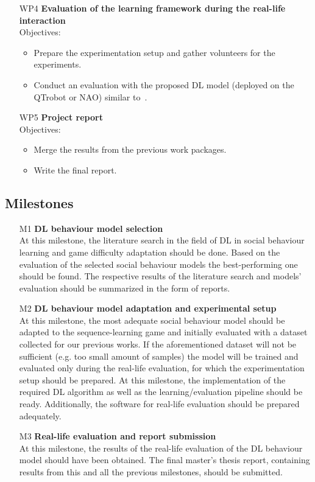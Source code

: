 \documentclass[thesis]{mas_proposal}
\begin{document}
\begin{enumerate}
\begin{itemize}
	\end{itemize}
	\item [WP4] \textbf{Evaluation of the learning framework during the real-life interaction} \\
	Objectives:
	\begin{itemize}
		\item Prepare the experimentation setup and gather volunteers for the experiments. 
		\item Conduct an evaluation with the proposed DL model (deployed on the QTrobot or NAO) similar to~\cite{Qureshi2016,romeo2021human}.
	\end{itemize}
	\item [WP5] \textbf{Project report} \\
	Objectives:
	\begin{itemize}
		\item Merge the results from the previous work packages.
		\item Write the final report.
	\end{itemize}
\end{enumerate}

\subsection{Milestones}
\begin{enumerate}
	\item[M1] \textbf{DL behaviour model selection} \\
	At this milestone, the literature search in the field of DL in social behaviour learning and game difficulty adaptation should be done. Based on the evaluation of the selected social behaviour models the best-performing one should be found. The respective results of the literature search and models' evaluation should be summarized in the form of reports.
	\item[M2] \textbf{DL behaviour model adaptation and experimental setup} \\
	At this milestone, the most adequate social behaviour model should be adapted to the sequence-learning game and initially evaluated with a dataset collected for our previous works. If the aforementioned dataset will not be sufficient (e.g. too small amount of samples) the model will be trained and evaluated only during the real-life evaluation, for which the experimentation setup should be prepared. At this milestone, the implementation of the required DL algorithm as well as the learning/evaluation pipeline should be ready. Additionally, the software for real-life evaluation should be prepared adequately.
	\item[M3] \textbf{Real-life evaluation and report submission} \\
	At this milestone, the results of the real-life evaluation of the DL behaviour model should have been obtained. The final master's thesis report, containing results from this and all the previous milestones, should be submitted.
\end{enumerate}
\end{document}
